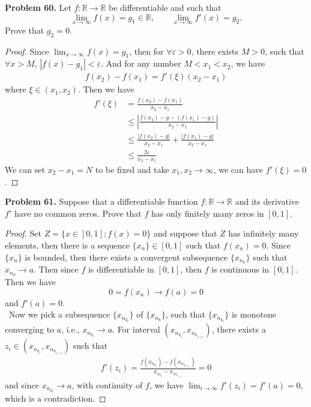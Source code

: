 \documentclass[12pt,leqno]{amsart}
\theoremstyle{definition}
\begin{document}
\noindent
{\bf Problem 60.}
Let $f:\mathbb{R}\to\mathbb{R}$ be differentiable and such that
$$
\lim_{x\to \infty} f(x)=g_1\in\mathbb{R},
\qquad
\lim_{x\to\infty} f'(x) = g_2.
$$
Prove that $g_2=0$.
\begin{proof}
Since $\lim_{x\to \infty} f(x)=g_1$, then for $\forall \varepsilon >0$, there exists $M>0$, such that $\forall x>M$, $|f(x)-g_1|<\varepsilon$. And for any number $M<x_1<x_2$, we have
\begin{align*}
    f(x_2)-f(x_1) = f'(\xi)(x_2-x_1)
\end{align*}
where $\xi\in(x_1,x_2)$. Then we have 
\begin{align*}
    f'(\xi) &=\frac{f(x_2)-f(x_1)}{x_2-x_1} \\
    & \leq \left|\frac{f(x_2)-g-(f(x_1)-g)}{x_2-x_1}  \right| \\
    & \leq \frac{\left|f(x_2)-g\right|}{x_2-x_1} + \frac{\left|f(x_1)-g\right|}{x_2-x_1} \\
    & \leq \frac{2\varepsilon}{x_2-x_1}
\end{align*}
We can set $x_2-x_1=N$ to be fixed and take $x_1,x_2\rightarrow \infty$, we can have $f'(\xi)=0$.
\end{proof}

\medskip


\noindent
{\bf Problem 61.}
Suppose that a differentiable function $f:\mathbb{R}\to\mathbb{R}$ and its derivative $f'$ have no common zeros. Prove that $f$ has only finitely many zeros in $[0,1]$.
\begin{proof}
Set $Z=\{x\in[0,1];f(x)=0\}$ and suppose that $Z$ has infinitely many elements, then there is a sequence $\{x_n\}\in [0,1]$ such that $f(x_n) = 0$. Since $\{x_n\}$ is bounded, then there exists a convergent subsequence $\{x_{n_k}\}$ such that $x_{n_k}\to a$. Then since $f$ is differentiable  in $[0,1]$, then $f$ is continuous in $[0,1]$. Then we have $$0 = f(x_n)\to f(a) = 0$$
and $f'(a) = 0$. \\
\hspace*{1em}\, Now we pick a subsequence $\{x_{n_{k_l}}\}$ of $\{x_{n_k}\}$, such that $\{x_{n_{k_l}}\}$ is monotone converging to $a$, i.e., $x_{n_{k_l}}\to a$. For interval $(x_{n_{k_i}},x_{n_{k_{i+1}}})$, there exists a $z_i\in (x_{n_{k_i}},x_{n_{k_{i+1}}})$ such that 
\begin{align*}
    f'(z_i) = \frac{f(x_{n_{k_i}}) - f(x_{n_{k_{i+1}}})}{x_{n_{k_i}} - x_{n_{k_{i+1}}}} = 0
\end{align*}
and since $x_{n_{k_l}}\to a$, with continuity of $f$, we have $\lim_{i\to\infty}f'(z_i) = f'(a) = 0$, which is a contradiction.
\end{proof}
\end{document}
